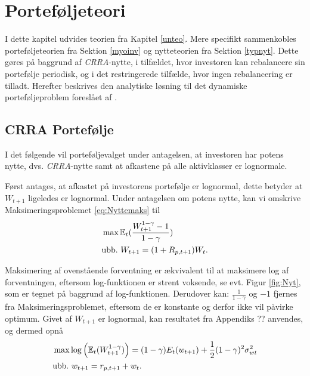 \documentclass[
  a4paper,
  oneside]{memoir}
\begin{document}
\hypertarget{portefuxf8ljeteori}{%
\chapter{Porteføljeteori}\label{portefuxf8ljeteori}}

I dette kapitel udvides teorien fra Kapitel \ref{unteo}. Mere specifikt sammenkobles porteføljeteorien fra Sektion \ref{myoinv} og nytteteorien fra Sektion \ref{typnyt}. Dette gøres på baggrund af \emph{CRRA}-nytte, i tilfældet, hvor investoren kan rebalancere sin portefølje periodisk, og i det restringerede tilfælde, hvor ingen rebalancering er tilladt. Herefter beskrives den analytiske løsning til det dynamiske porteføljeproblem foreslået af \citep{JurVic2011}.

\hypertarget{crra-portefuxf8lje}{%
\section{CRRA Portefølje}\label{crra-portefuxf8lje}}

I det følgende vil porteføljevalget under antagelsen, at investoren har potens nytte, dvs. \emph{CRRA}-nytte samt at afkastene på alle aktivklasser er lognormale.

Først antages, at afkastet på investorens portefølje er lognormal, dette betyder at \(W_{t+1}\) ligeledes er lognormal. Under antagelsen om potens nytte, kan vi omskrive Maksimeringsproblemet \eqref{eq:Nyttemaks} til
\begin{align}
&\max\mathbb{E}_t(\frac{W_{t+1}^{1-\gamma}-1}{1-\gamma}) \label{eq:CRRAmaks}\\
&\text{ubb.}\,\,W_{t+1}=(1+R_{p,t+1})W_t.\notag
\end{align}

Maksimering af ovenstående forventning er ækvivalent til at maksimere log af forventningen, eftersom log-funktionen er strent voksende, se evt. Figur \ref{fig:Nyt}, som er tegnet på baggrund af log-funktionen. Derudover kan: \(\tfrac{1}{1-\gamma}\) og \(-1\) fjernes fra Maksimeringsproblemet, eftersom de er konstante og derfor ikke vil påvirke optimum. Givet af \(W_{t+1}\) er lognormal, kan resultatet fra Appendiks ?? anvendes, og dermed opnå
\begin{align}
&\max \log\left(\mathbb{E}_t(W_{t+1}^{1-\gamma})\right)=(1-\gamma){E}_t(w_{t+1})+\frac{1}{2}(1-\gamma)^2\sigma_{wt}^2 \label{eq:CRRAmakslog}\\
&\text{ubb.}\,\,w_{t+1}=r_{p,t+1} + w_t.\notag
\end{align}
\end{document}
